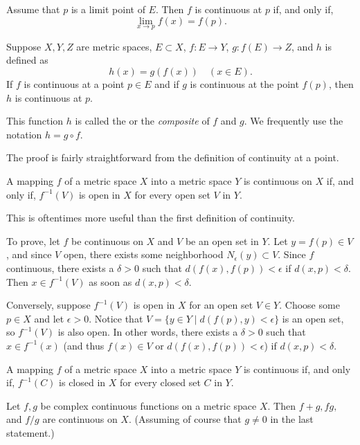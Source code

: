 \documentclass{article}
\begin{document}
\begin{theorem}
    Assume that $p$ is a limit point of $E$. Then $f$ is continuous at $p$ if, and only if, \[\lim_{x\rightarrow p}f(x)=f(p).\]
\end{theorem}
\begin{theorem}
    Suppose $X,Y,Z$ are metric spaces, $E\subset X$, $f:E\rightarrow Y$, $g:f(E)\rightarrow Z$, and $h$ is defined as
    \[h(x)=g(f(x))\quad(x\in E).\]If $f$ is continuous at a point $p\in E$ and if $g$ is continuous at the point $f(p)$, then $h$ is continuous at $p$.

    This function $h$ is called the  or the \textit{composite} of $f$ and $g$. We frequently use the notation $h=g\circ f$.
\end{theorem}
\begin{remark}
    The proof is fairly straightforward from the definition of continuity at a point.
\end{remark}
\begin{theorem}
    A mapping $f$ of a metric space $X$ into a metric space $Y$ is continuous on $X$ if, and only if, $f^{-1}(V)$ is open in $X$ for every open set $V$ in $Y$.
\end{theorem}
\begin{remark}
    This is oftentimes more useful than the first definition of continuity.

    To prove, let $f$ be continuous on $X$ and $V$ be an open set in $Y$. Let $y=f(p)\in V$, and since $V$ open, there exists some neighborhood $N_{\epsilon}(y)\subset V$. Since $f$ continuous, there exists a $\delta >0$ such that $d(f(x),f(p))<\epsilon$ if $d(x,p)<\delta$. Then $x\in f^{-1}(V)$ as soon as $d(x,p)<\delta$.

    Conversely, suppose $f^{-1}(V)$ is open in $X$ for an open set $V\in Y$. Choose some $p\in X$ and let $\epsilon>0$. Notice that $V=\{y\in Y\mid d(f(p),y)<\epsilon\}$ is an open set, so $f^{-1}(V)$ is also open. In other words, there exists a $\delta>0$ such that $x\in f^{-1}(x)$ (and thus $f(x)\in V$ or $d(f(x),f(p))<\epsilon$) if $d(x,p)<\delta$.
\end{remark}
\begin{corollary}
    A mapping $f$ of a metric space $X$ into a metric space $Y$ is continuous if, and only if, $f^{-1}(C)$ is closed in $X$ for every closed set $C$ in $Y$.
\end{corollary}
\begin{theorem}
    Let $f,g$ be complex continuous functions on a metric space $X$. Then $f+g,fg,$ and $f/g$ are continuous on $X$. (Assuming of course that $g\neq 0$ in the last statement.)
\end{theorem}
\end{document}
